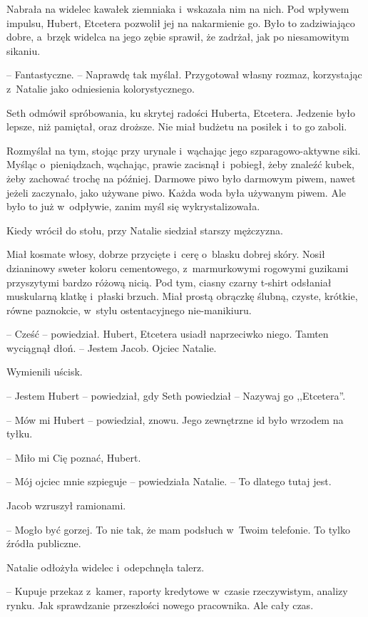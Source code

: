 \documentclass[oneside,polish,11pt,sfheadings]{mwbk}
\begin{document}
Nabrała na widelec kawałek ziemniaka i~wskazała nim na nich. Pod wpływem
impulsu, Hubert, Etcetera pozwolił jej na nakarmienie go. Było to
zadziwiająco dobre, a~brzęk widelca na jego zębie sprawił, że zadrżał,
jak po niesamowitym sikaniu.

-- Fantastyczne. -- Naprawdę tak myślał. Przygotował własny rozmaz,
korzystając z~Natalie jako odniesienia kolorystycznego.

Seth odmówił spróbowania, ku skrytej radości Huberta, Etcetera. Jedzenie
było lepsze, niż pamiętał, oraz droższe. Nie miał budżetu na posiłek i~to go zaboli.

Rozmyślał na tym, stojąc przy urynale i~wąchając jego szparagowo-aktywne
siki. Myśląc o~pieniądzach, wąchając, prawie zacisnął i~pobiegł, żeby
znaleźć kubek, żeby zachować trochę na później. Darmowe piwo było
darmowym piwem, nawet jeżeli zaczynało, jako używane piwo. Każda woda
była używanym piwem. Ale było to już w~odpływie, zanim myśl się
wykrystalizowała.

Kiedy wrócił do stołu, przy Natalie siedział starszy mężczyzna.

Miał kosmate włosy, dobrze przycięte i~cerę o~blasku dobrej skóry. Nosił
dzianinowy sweter koloru cementowego, z~marmurkowymi rogowymi guzikami
przyszytymi bardzo różową nicią. Pod tym, ciasny czarny t-shirt
odsłaniał muskularną klatkę i~płaski brzuch. Miał prostą obrączkę
ślubną, czyste, krótkie, równe paznokcie, w~stylu ostentacyjnego
nie-manikiuru.

-- Cześć -- powiedział. Hubert, Etcetera usiadł naprzeciwko niego. Tamten
wyciągnął dłoń. -- Jestem Jacob. Ojciec Natalie.

Wymienili uścisk. 

-- Jestem Hubert -- powiedział, gdy Seth powiedział -- Nazywaj go ,,Etcetera''.

-- Mów mi Hubert -- powiedział, znowu. Jego zewnętrzne id było wrzodem na
tyłku.

-- Miło mi Cię poznać, Hubert.

-- Mój ojciec mnie szpieguje -- powiedziała Natalie. -- To dlatego tutaj
jest.

Jacob wzruszył ramionami. 

-- Mogło być gorzej. To nie tak, że mam
podsłuch w~Twoim telefonie. To tylko źródła publiczne.

Natalie odłożyła widelec i~odepchnęła talerz. 

-- Kupuje przekaz z~kamer,
raporty kredytowe w~czasie rzeczywistym, analizy rynku. Jak sprawdzanie
przeszłości nowego pracownika. Ale cały czas.
\end{document}
